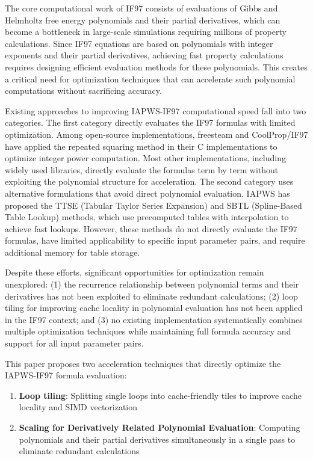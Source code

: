\documentclass{article}
\begin{document}
The core computational work of IF97 consists of evaluations of Gibbs and Helmholtz free energy polynomials and their partial derivatives, which can become a bottleneck in large-scale simulations requiring millions of property calculations. Since IF97 equations are based on polynomials with integer exponents and their partial derivatives, achieving fast property calculations requires designing efficient evaluation methods for these polynomials. This creates a critical need for optimization techniques that can accelerate such polynomial computations without sacrificing accuracy.

Existing approaches to improving IAPWS-IF97 computational speed fall into two categories. The first category directly evaluates the IF97 formulas with limited optimization. Among open-source implementations, freesteam \cite{FreeSteam} and CoolProp/IF97 \cite{CoolProp,CoolPropIF97} have applied the repeated squaring method in their C implementations to optimize integer power computation. Most other implementations, including widely used libraries, directly evaluate the formulas term by term without exploiting the polynomial structure for acceleration. The second category uses alternative formulations that avoid direct polynomial evaluation. IAPWS has proposed the TTSE (Tabular Taylor Series Expansion) \cite{TTSE} and SBTL (Spline-Based Table Lookup) \cite{SBTL} methods, which use precomputed tables with interpolation to achieve fast lookups. However, these methods do not directly evaluate the IF97 formulas, have limited applicability to specific input parameter pairs, and require additional memory for table storage.

Despite these efforts, significant opportunities for optimization remain unexplored: (1) the recurrence relationship between polynomial terms and their derivatives has not been exploited to eliminate redundant calculations; (2) loop tiling for improving cache locality in polynomial evaluation has not been applied in the IF97 context; and (3) no existing implementation systematically combines multiple optimization techniques while maintaining full formula accuracy and support for all input parameter pairs.

This paper proposes two acceleration techniques that directly optimize the IAPWS-IF97 formula evaluation:
\begin{enumerate}
    \item \textbf{Loop tiling}: Splitting single loops into cache-friendly tiles to improve cache locality and SIMD vectorization
    \item \textbf{Scaling for Derivatively Related Polynomial Evaluation}: Computing polynomials and their partial derivatives simultaneously in a single pass to eliminate redundant calculations
\end{enumerate}
\end{document}

